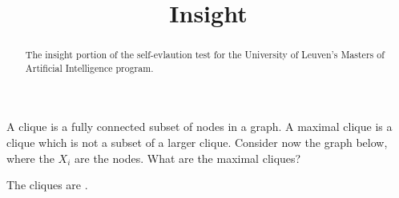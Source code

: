 \documentclass{ximera}
\title{Insight}
\begin{document}
\begin{abstract}
The insight portion of the self-evlaution test for the University of
Leuven's Masters of Artificial Intelligence program.
\end{abstract}
\maketitle


\begin{question}
A clique is  a fully connected subset of nodes in a graph. 
A maximal clique is a clique which is not a subset of a larger clique.
Consider now the graph below, where the $X_i$ are the nodes.  What are the maximal cliques? 
\begin{image}
\end{image}



\begin{solution}%
The cliques are .
\end{solution}
\end{question}
\end{document}
